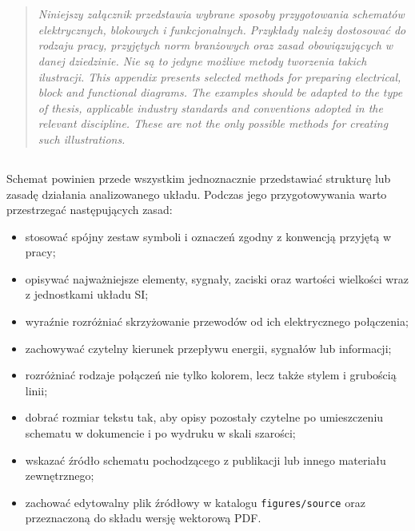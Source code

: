 \chapter{}
\label{app:schematy}

\begin{quote}
\itshape
\ploren
  {
Niniejszy załącznik przedstawia wybrane sposoby przygotowania schematów elektrycznych,
blokowych i funkcjonalnych. Przykłady należy dostosować do rodzaju pracy, przyjętych
norm branżowych oraz zasad obowiązujących w danej dziedzinie. Nie są to jedyne możliwe
metody tworzenia takich ilustracji.
  }
  {This appendix presents selected methods for preparing electrical, block and functional diagrams. The examples should be adapted to the type of thesis, applicable industry standards and conventions adopted in the relevant discipline. These are not the only possible methods for creating such illustrations.}
\end{quote}

\section{}

Schemat powinien przede wszystkim jednoznacznie przedstawiać strukturę lub zasadę
działania analizowanego układu. Podczas jego przygotowywania warto przestrzegać
następujących zasad:

\begin{itemize}
  \item stosować spójny zestaw symboli i oznaczeń zgodny z konwencją przyjętą w pracy;
  \item opisywać najważniejsze elementy, sygnały, zaciski oraz wartości wielkości wraz
        z jednostkami układu SI;
  \item wyraźnie rozróżniać skrzyżowanie przewodów od ich elektrycznego połączenia;
  \item zachowywać czytelny kierunek przepływu energii, sygnałów lub informacji;
  \item rozróżniać rodzaje połączeń nie tylko kolorem, lecz także stylem i grubością linii;
  \item dobrać rozmiar tekstu tak, aby opisy pozostały czytelne po umieszczeniu schematu
        w dokumencie i po wydruku w skali szarości;
  \item wskazać źródło schematu pochodzącego z publikacji lub innego materiału zewnętrznego;
  \item zachować edytowalny plik źródłowy w katalogu
        \texttt{figures/source} oraz przeznaczoną do składu wersję wektorową PDF.
\end{itemize}

